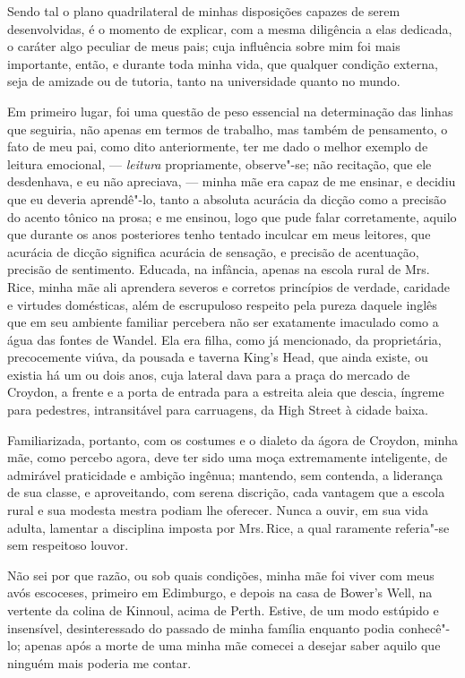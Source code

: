 Sendo tal o plano quadrilateral de minhas disposições capazes de
serem desenvolvidas, é o momento de explicar, com a mesma diligência a
elas dedicada, o caráter algo peculiar de meus pais; cuja influência
sobre mim foi mais importante, então, e durante toda minha vida, que
qualquer condição externa, seja de amizade ou de tutoria, tanto na
universidade quanto no mundo.

Em primeiro lugar, foi uma questão de peso essencial na determinação das
linhas que seguiria, não apenas em termos de trabalho, mas também de
pensamento, o fato de meu pai, como dito anteriormente, ter me dado o
melhor exemplo de leitura emocional, --- \textit{leitura} propriamente,
observe"-se; não recitação, que ele desdenhava, e eu não apreciava, ---
minha mãe era capaz de me ensinar, e decidiu que eu deveria aprendê"-lo,
tanto a absoluta acurácia da dicção como a precisão do acento tônico na
prosa; e me ensinou, logo que pude falar corretamente, aquilo que
durante os anos posteriores tenho tentado inculcar em meus leitores, que
acurácia de dicção significa acurácia de sensação, e precisão de
acentuação, precisão de sentimento. Educada, na infância, apenas na
escola rural de Mrs.\,Rice, minha mãe ali aprendera severos e corretos
princípios de verdade, caridade e virtudes domésticas, além de
escrupuloso respeito pela pureza daquele inglês que em seu ambiente
familiar percebera não ser exatamente imaculado como a água das fontes
de Wandel. Ela era filha, como já mencionado, da proprietária,
precocemente viúva, da pousada e taverna King's Head, que ainda existe,
ou existia há um ou dois anos, cuja lateral dava para a praça do mercado
de Croydon, a frente e a porta de entrada para a estreita aleia que
descia, íngreme para pedestres, intransitável para carruagens, da High
Street à cidade baixa.

Familiarizada, portanto, com os costumes e o dialeto da ágora de
Croydon, minha mãe, como percebo agora, deve ter sido uma moça
extremamente inteligente, de admirável praticidade e ambição ingênua;
mantendo, sem contenda, a liderança de sua classe, e aproveitando, com
serena discrição, cada vantagem que a escola rural e sua modesta mestra
podiam lhe oferecer. Nunca a ouvir, em sua vida adulta, lamentar a
disciplina imposta por Mrs.\,Rice, a qual raramente referia"-se sem
respeitoso louvor.

Não sei por que razão, ou sob quais condições, minha mãe foi viver com
meus avós escoceses, primeiro em Edimburgo, e depois na casa de Bower's
Well, na vertente da colina de Kinnoul, acima de Perth. Estive, de um
modo estúpido e insensível, desinteressado do passado de minha família
enquanto podia conhecê"-lo; apenas após a morte de uma minha mãe comecei
a desejar saber aquilo que ninguém mais poderia me contar.

